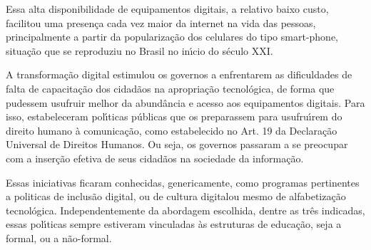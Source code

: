\documentclass[
12pt,		%
openright,	%
twoside,  %
a4paper,			%
chapter=TITLE,		%
english,			%
french,				%
spanish,			%
brazil				%
]{USPSC-classe/USPSC}
\begin{document}
Essa alta disponibilidade de equipamentos digitais, a relativo baixo custo, facilitou uma presen\c{c}a cada vez maior da internet na vida das pessoas, principalmente a partir da populariza\c{c}\~ao dos celulares do tipo \textquotedbl smart-phone\textquotedbl , situa\c{c}\~ao que se reproduziu no Brasil no in\'{\i}cio do s\'eculo XXI.

















A transforma\c{c}\~ao digital estimulou os governos a enfrentarem as dificuldades  de falta de  capacita\c{c}\~ao dos cidad\~aos na apropria\c{c}\~ao tecnol\'ogica, de forma que pudessem usufruir melhor da abund\^ancia e acesso aos equipamentos digitais. Para isso, estabeleceram pol\'{\i}ticas p\'ublicas que os preparassem para usufru\'{\i}rem do direito humano \`a comunica\c{c}\~ao, como estabelecido no Art. 19 da Declara\c{c}\~ao Universal de Direitos Humanos. Ou seja, os governos passaram a se preocupar com a inser\c{c}\~ao efetiva de seus cidad\~aos na sociedade da informa\c{c}\~ao.

















Essas iniciativas ficaram conhecidas, genericamente, como programas pertinentes a politicas de \textquotedbl inclus\~ao digital, ou  de \textquotedbl cultura digital\textquotedbl  ou mesmo de \textquotedbl alfabetiza\c{c}\~ao tecnol\'ogica\textquotedbl . Independentemente da abordagem escolhida, dentre as tr\^es indicadas, essas pol\'{\i}ticas sempre estiveram vinculadas \`as estruturas de educa\c{c}\~ao, seja a formal, ou a n\~ao-formal.
\end{document}
